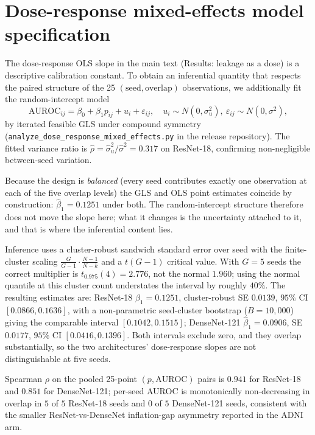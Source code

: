 \documentclass[11pt]{article}
\providecommand{\pb}{\discretionary{}{}{}}
\begin{document}
\section{Dose-response mixed-effects model specification}
\label{sm:mixed_effects}

The dose-response OLS slope in the main text (Results: leakage as a dose) is a
descriptive calibration constant. To obtain an inferential quantity
that respects the paired structure of the 25 $(\text{seed},
\text{overlap})$ observations, we additionally fit the random-intercept
model
\[
  \mathrm{AUROC}_{ij} = \beta_0 + \beta_1 p_{ij} + u_i + \varepsilon_{ij},
  \quad u_i \sim N(0, \sigma_u^2),\ \varepsilon_{ij} \sim N(0, \sigma^2),
\]
by iterated feasible GLS under compound symmetry
(\texttt{analyze\_\pb dose\_\pb response\_\pb mixed\_\pb effects.py} in the
release repository). The fitted variance ratio is
$\widehat{\rho} = \widehat{\sigma}_u^2/\widehat{\sigma}^2 = 0.317$ on
ResNet-18, confirming non-negligible between-seed variation.

Because the design is \emph{balanced}
(every seed contributes exactly one observation at each of the five
overlap levels) the GLS and OLS point estimates coincide by construction: $\widehat{\beta}_1 = 0.1251$
under both. The random-intercept structure therefore does not move the
slope here; what it changes is the uncertainty attached to it, and that
is where the inferential content lies.

Inference uses a cluster-robust sandwich standard error over seed with
the finite-cluster scaling $\tfrac{G}{G-1}\cdot\tfrac{N-1}{N-k}$ and a
$t(G{-}1)$ critical value. With $G=5$ seeds the correct multiplier is
$t_{0.975}(4) = 2.776$, not the normal $1.960$; using the normal
quantile at this cluster count understates the interval by roughly
$40\%$. The resulting estimates are: ResNet-18
$\widehat{\beta}_1 = 0.1251$, cluster-robust SE $0.0139$, $95\%$ CI
$[0.0866, 0.1636]$, with a non-parametric seed-cluster bootstrap
($B{=}10{,}000$) giving the comparable interval $[0.1042, 0.1515]$;
DenseNet-121 $\widehat{\beta}_1 = 0.0906$, SE $0.0177$, $95\%$ CI
$[0.0416, 0.1396]$. Both intervals exclude zero, and they overlap
substantially, so the two architectures' dose-response slopes are not
distinguishable at five seeds.

Spearman $\rho$ on the pooled 25-point $(p, \mathrm{AUROC})$ pairs is
$0.941$ for ResNet-18 and $0.851$ for DenseNet-121; per-seed AUROC is
monotonically non-decreasing in overlap in $5$ of $5$ ResNet-18 seeds
and $0$ of $5$ DenseNet-121 seeds, consistent with the smaller
ResNet-vs-DenseNet inflation-gap asymmetry reported in the ADNI arm.
\end{document}
